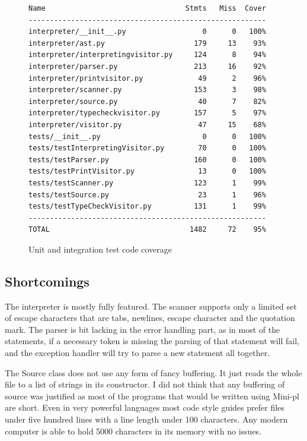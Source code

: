 \documentclass[12pt,a4paper]{article}
\begin{document}
\begin{figure}\label{codecov}
  \caption{Unit and integration test code coverage}
  \begin{verbatim}
Name                                 Stmts   Miss  Cover
--------------------------------------------------------
interpreter/__init__.py                  0      0   100%
interpreter/ast.py                     179     13    93%
interpreter/interpretingvisitor.py     124      8    94%
interpreter/parser.py                  213     16    92%
interpreter/printvisitor.py             49      2    96%
interpreter/scanner.py                 153      3    98%
interpreter/source.py                   40      7    82%
interpreter/typecheckvisitor.py        157      5    97%
interpreter/visitor.py                  47     15    68%
tests/__init__.py                        0      0   100%
tests/testInterpretingVisitor.py        70      0   100%
tests/testParser.py                    160      0   100%
tests/testPrintVisitor.py               13      0   100%
tests/testScanner.py                   123      1    99%
tests/testSource.py                     23      1    96%
tests/testTypeCheckVisitor.py          131      1    99%
--------------------------------------------------------
TOTAL                                 1482     72    95%
  \end{verbatim}
\end{figure}

\subsection{Shortcomings}

The interpreter is mostly fully featured. 
The scanner supports only a limited set of escape characters that are
tabs, newlines, escape character and the quotation mark.
The parser is bit lacking
in the error handling part, as in most of the statements, if a 
necessary token is missing the parsing of that statement will fail,
and the exception handler will try to parse a new statement all together.

The Source class does not use any form of fancy buffering. It just reads
the whole file to a list of strings in its constructor. I did not think
that any buffering of source was justified as most of the programs 
that would be written using Mini-pl are short. Even in very powerful
languages most code style guides prefer files under five hundred lines with
a line length under 100 characters. Any modern computer is able to hold
5000 characters in its memory with no issues.
\end{document}
